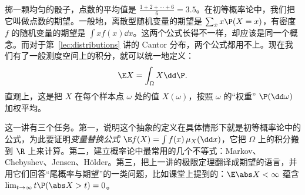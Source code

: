 \label{lec:expectation}

掷一颗均匀的骰子，点数的平均值是 $\frac{1+2+\cdots+6}6=3.5$。在初等概率论中，我们把它叫做点数的期望。一般地，离散型随机变量的期望是 $\sum_xx\P(X=x)$，有密度 $f$ 的随机变量的期望是 $\int xf(x)\dd x$。这两个公式长得不一样，却应该是同一个概念。而对于第~\ref{lec:distributions} 讲的 Cantor 分布，两个公式都用不上。现在我们有了一般测度空间上的积分，就可以统一地定义：
\[
\E X=\int_\Omega X\dd \P .
\]
直观上，这是把 $X$ 在每个样本点 $\omega$ 处的值 $X(\omega)$，按照 $\omega$ 的“权重” $\P(\dd\omega)$ 加权平均。

这一讲有三个任务。第一，说明这个抽象的定义在具体情形下就是初等概率论中的公式，为此要证明\emph{变量替换公式} $\E f(X)=\int f(x)\,\mu_X(\dd x)$，它把 $\Omega$ 上的积分搬到 $\R$ 上来计算。第二，建立概率论中最常用的几个不等式：Markov、Chebyshev、Jensen、Hölder。第三，把上一讲的极限定理翻译成期望的语言，并用它们回答“尾概率与期望”的一类问题，比如课堂上提到的：$\E\abs X<\infty$ 蕴含 $\lim_{t\to\infty}t\P(\abs X>t)=0$。


